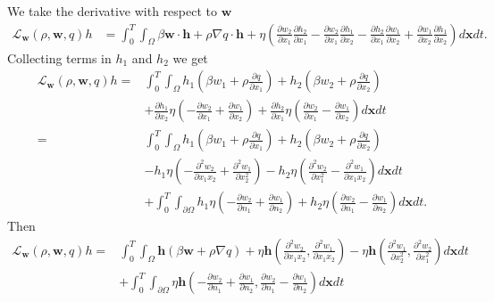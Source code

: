 \documentclass[11pt, a4paper]{article}
\theoremstyle{definition}
\newcommand{\w}{\mathbf{w}}
\newcommand{\x}{\mathbf{x}}
\newcommand{\h}{\mathbf{h}}
\begin{document}
We take the derivative with respect to $\w$
\begin{align*}
	\mathcal L_\w(\rho, \w, q)h &= \int_0^T \int_\Omega \beta \w \cdot  \h + \rho \nabla q \cdot \h + \eta \left(\frac{\partial w_2}{\partial x_1} \frac{\partial h_2}{\partial x_1} - \frac{\partial w_2}{\partial x_1}\frac{\partial h_1}{\partial x_2} - \frac{\partial h_2}{\partial x_1}\frac{\partial w_1}{\partial x_2} +  \frac{\partial w_1}{\partial x_2}\frac{\partial h_1}{\partial x_2}\right) d\x dt.
\end{align*}
Collecting terms in $h_1$ and $h_2$ we get
\begin{align*}
	\mathcal L_\w(\rho, \w, q)h =& \int_0^T \int_\Omega 
	h_1 \left( \beta w_1 + \rho \frac{\partial q}{\partial x_1} \right)+
	h_2 \left( \beta w_2 + \rho \frac{\partial q}{\partial x_2} \right)\\
    &+\frac{\partial h_1}{\partial x_2} \eta \left(- \frac{\partial w_2}{\partial x_1} + \frac{\partial w_1}{\partial x_2}\right)+
	\frac{\partial h_2}{\partial x_1} \eta \left(\frac{\partial w_2}{\partial x_1} -\frac{\partial w_1}{\partial x_2} \right)
	d\x dt\\
	=& \int_0^T \int_\Omega 
	h_1 \left( \beta w_1 + \rho \frac{\partial q}{\partial x_1} \right)+
	h_2 \left( \beta w_2 + \rho \frac{\partial q}{\partial x_2} \right)\\
	&- h_1 \eta \left(- \frac{\partial^2 w_2}{\partial x_1 x_2} + \frac{\partial^2 w_1}{\partial x_2^2}\right)
	- h_2 \eta \left(\frac{\partial^2 w_2}{\partial x_1^2} -\frac{\partial^2 w_1}{\partial x_1x_2} \right) d \x dt\\
	&+ \int_0^T \int_{\partial \Omega} h_1 \eta \left(- \frac{\partial w_2}{\partial n_1} + \frac{\partial w_1}{\partial n_2} \right) + h_2 \eta \left(\frac{\partial w_2}{\partial n_1} -\frac{\partial w_1}{\partial n_2} \right)
	d\x dt.
\end{align*}
Then
\begin{align*}
	\mathcal L_\w(\rho, \w, q)h =&  \int_0^T \int_\Omega \h \left(\beta \w + \rho \nabla q\right) + \eta \h \left(\frac{\partial^2 w_2}{\partial x_1 x_2}, \frac{\partial^2 w_1}{\partial x_1x_2}   \right) - \eta \h \left(\frac{\partial^2 w_1}{\partial x_2^2},\frac{\partial^2 w_2}{\partial x_1^2} \right) d\x dt\\
	&+ \int_0^T \int_{\partial \Omega} \eta \h \left(-\frac{\partial w_2}{\partial n_1} +\frac{\partial w_1}{\partial n_2}, \frac{\partial w_2}{\partial n_1} -\frac{\partial w_1}{\partial n_2} \right) d\x dt
\end{align*}
\end{document}
